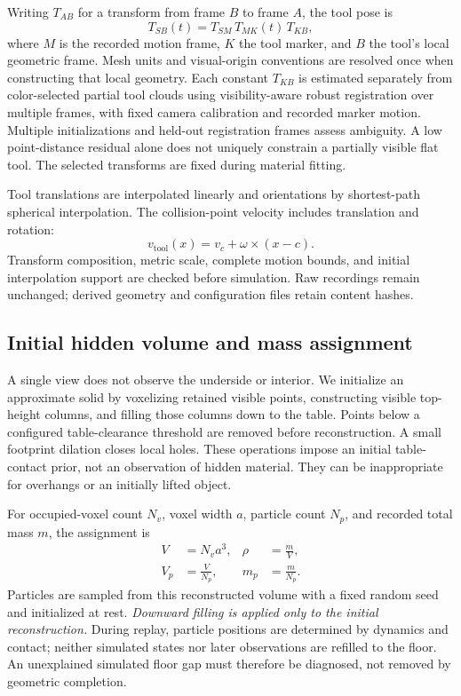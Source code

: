 Writing $T_{AB}$ for a transform from frame $B$ to frame $A$, the tool pose is
\begin{equation}
 T_{SB}(t)=T_{SM}\,T_{MK}(t)\,T_{KB},
 \label{eq:toolpose}
\end{equation}
where $M$ is the recorded motion frame, $K$ the tool marker, and $B$ the tool's local geometric frame. Mesh units and visual-origin conventions are resolved once when constructing that local geometry. Each constant $T_{KB}$ is estimated separately from color-selected partial tool clouds using visibility-aware robust registration over multiple frames, with fixed camera calibration and recorded marker motion. Multiple initializations and held-out registration frames assess ambiguity. A low point-distance residual alone does not uniquely constrain a partially visible flat tool. The selected transforms are fixed during material fitting.

Tool translations are interpolated linearly and orientations by shortest-path spherical interpolation. The collision-point velocity includes translation and rotation:
\begin{equation}
 v_{\mathrm{tool}}(x)=v_c+\omega\times(x-c).
 \label{eq:toolvelocity}
\end{equation}
Transform composition, metric scale, complete motion bounds, and initial interpolation support are checked before simulation. Raw recordings remain unchanged; derived geometry and configuration files retain content hashes.

\subsection{Initial hidden volume and mass assignment}

A single view does not observe the underside or interior. We initialize an approximate solid by voxelizing retained visible points, constructing visible top-height columns, and filling those columns down to the table. Points below a configured table-clearance threshold are removed before reconstruction. A small footprint dilation closes local holes. These operations impose an initial table-contact prior, not an observation of hidden material. They can be inappropriate for overhangs or an initially lifted object.

For occupied-voxel count $N_v$, voxel width $a$, particle count $N_p$, and recorded total mass $m$, the assignment is
\begin{equation}
 \begin{aligned}
 V&=N_v a^3, & \rho&=\frac{m}{V},\\
 V_p&=\frac{V}{N_p}, & m_p&=\frac{m}{N_p}.
 \end{aligned}
 \label{eq:mass}
\end{equation}
Particles are sampled from this reconstructed volume with a fixed random seed and initialized at rest. \emph{Downward filling is applied only to the initial reconstruction.} During replay, particle positions are determined by dynamics and contact; neither simulated states nor later observations are refilled to the floor. An unexplained simulated floor gap must therefore be diagnosed, not removed by geometric completion.

